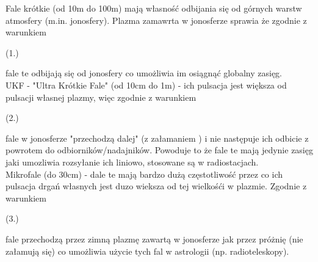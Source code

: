 \begin{solution}
Fale krótkie (od 10m do 100m) mają własność odbijania się od górnych warstw atmosfery (m.in. jonosfery). Plazma zamawrta w jonosferze sprawia że zgodnie z warunkiem \begin{textbf} {(1.)}\end{textbf} fale te odbijają się od jonosfery co umożliwia im osiągnąć globalny zasięg.\\
UKF - "Ultra Krótkie Fale" (od 10cm do 1m) - ich pulsacja jest większa od pulsacji własnej plazmy, więc zgodnie z warunkiem \begin{textbf} {(2.)}\end{textbf}  fale w jonosferze "przechodzą dalej" (z załamaniem ) i nie następuje ich odbicie z powrotem do odbiorników/nadajników. Powoduje to że fale te mają jedynie zasięg jaki umozliwia rozsyłanie ich liniowo, stosowane są w radiostacjach.\\
Mikrofale (do 30cm) - dale te mają bardzo dużą częstotliwość przez co ich pulsacja drgań własnych jest duzo wieksza od tej wielkośći w plazmie. Zgodnie z warunkiem \begin{textbf} {(3.)}\end{textbf} fale przechodzą przez zimną plazmę zawartą w jonosferze jak przez próżnię (nie załamują się) co umożliwia użycie tych fal w astrologii (np. radioteleskopy).

\end{solution}